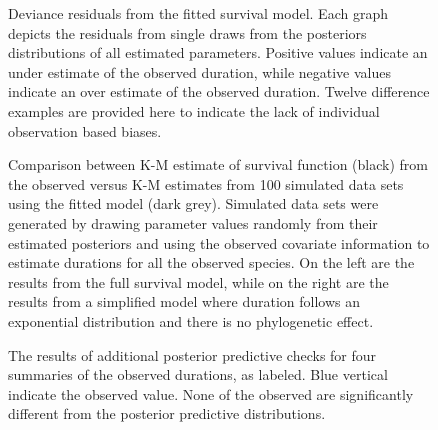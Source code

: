 \documentclass{nature}
\begin{document}



\begin{figure}[ht]
  \caption{Deviance residuals from the fitted survival model. Each graph depicts the residuals from single draws from the posteriors distributions of all estimated parameters. Positive values indicate an under estimate of the observed duration, while negative values indicate an over estimate of the observed duration. Twelve difference examples are provided here to indicate the lack of individual observation based biases.}
  \label{fig:ppc_res}
\end{figure}

\begin{figure}[ht]
  \caption{Comparison between K-M estimate of survival function (black) from the observed versus K-M estimates from 100 simulated data sets using the fitted model (dark grey). Simulated data sets were generated by drawing parameter values randomly from their estimated posteriors and using the observed covariate information to estimate durations for all the observed species. On the left are the results from the full survival model, while on the right are the results from a simplified model where duration follows an exponential distribution and there is no phylogenetic effect.}
  \label{fig:ppc_surv}
\end{figure}

\begin{figure}[ht]
  \caption{The results of additional posterior predictive checks for four summaries of the observed durations, as labeled. Blue vertical indicate the observed value. None of the observed are significantly different from the posterior predictive distributions.}
  \label{fig:ppc_quant}
\end{figure}
\end{document}
